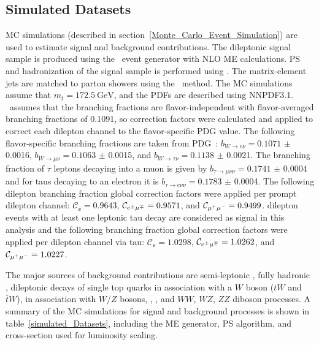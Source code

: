 \subsection{Simulated Datasets}
MC simulations (described in section~\ref{Monte_Carlo_Event_Simulation}) are used to estimate signal and background contributions. 
The dileptonic \ttbar signal sample is produced using the \Powheg\ event generator with NLO ME calculations. 
PS and hadronization of the \ttbar signal sample is performed using \Pythia. 
The matrix-element jets are matched to parton showers using the \Powheg\ method. 
The MC simulations assume that $m_t = \SI{172.5}{\GeV}$, and the PDFs are described using NNPDF3.1.
\Powheg\ assumes that the \ttbar branching fractions are flavor-independent with flavor-averaged branching fractions of $0.1091$, so correction factors were calculated and applied to correct each dilepton channel to the flavor-specific PDG value.
The following flavor-specific branching fractions are taken from PDG~\cite{bib:PDG}: $b_{{\ensuremath{W\to e\nu}}} = 0.1071$ $\pm$ 0.0016, $b_{{\ensuremath{W\to \mu\nu}}} = 0.1063$ $\pm$ 0.0015, and $b_{{\ensuremath{W\to \tau\nu}}} = 0.1138$ $\pm$ 0.0021.
The branching fraction of $\tau$ leptons decaying into a muon is given by $b_{{\ensuremath{\tau\to \mu\nu\nu}}} = 0.1741$ $\pm$ 0.0004 and for taus decaying to an electron it is $b_{{\ensuremath{\tau\to e\nu\nu}}} = 0.1783$ $\pm$ 0.0004.
The following \ttbar dilepton branching fraction global correction factors were applied per prompt dilepton channel: $\mathcal{C}_{\ee} = 0.9643$, $\mathcal{C}_{e^{\pm}\mu^{\mp}} = 0.9571$, and $\mathcal{C}_{\mu^{+}\mu^{-}} = 0.9499$.  
\ttbar dilepton events with at least one leptonic tau decay are considered as signal in this analysis and the following branching fraction global correction factors were applied per dilepton channel via tau: $\mathcal{C}_{\ee} = 1.0298$, $\mathcal{C}_{e^{\pm}\mu^{\mp}} = 1.0262$, and $\mathcal{C}_{\mu^{+}\mu^{-}} = 1.0227$.

The major sources of background contributions are semi-leptonic \ttbar, fully hadronic \ttbar, dileptonic decays of single top quarks in association with a $W$ boson ($tW$ and $\bar{t}W$), \ttbar in association with $W/Z$ bosons, \zjets, \wjets, and $WW$, $WZ$, $ZZ$ diboson processes. 
A summary of the MC simulations for signal and background processes is shown in table~\ref{simulated_Datasets}, including the ME generator, PS algorithm, and cross-section used for luminosity scaling.

